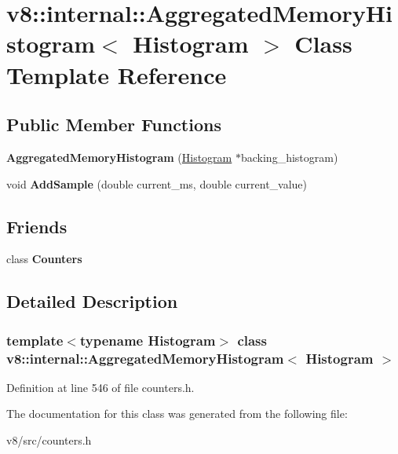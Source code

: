 \hypertarget{classv8_1_1internal_1_1AggregatedMemoryHistogram}{}\section{v8\+:\+:internal\+:\+:Aggregated\+Memory\+Histogram$<$ Histogram $>$ Class Template Reference}
\label{classv8_1_1internal_1_1AggregatedMemoryHistogram}
\subsection*{Public Member Functions}
\begin{DoxyCompactItemize}
\item 
\mbox{\label{classv8_1_1internal_1_1AggregatedMemoryHistogram_a8b49cfff760e104f1150397b4a774806}} 
{\bfseries Aggregated\+Memory\+Histogram} (\mbox{\hyperlink{classv8_1_1internal_1_1Histogram}{Histogram}} $\ast$backing\+\_\+histogram)
\item 
\mbox{\label{classv8_1_1internal_1_1AggregatedMemoryHistogram_afed07b5cc00d1e8f58be83d85ea6fe94}} 
void {\bfseries Add\+Sample} (double current\+\_\+ms, double current\+\_\+value)
\end{DoxyCompactItemize}
\subsection*{Friends}
\begin{DoxyCompactItemize}
\item 
\mbox{\label{classv8_1_1internal_1_1AggregatedMemoryHistogram_a5545327f141103b96b160ddc48274bc0}} 
class {\bfseries Counters}
\end{DoxyCompactItemize}


\subsection{Detailed Description}
\subsubsection*{template$<$typename Histogram$>$\newline
class v8\+::internal\+::\+Aggregated\+Memory\+Histogram$<$ Histogram $>$}



Definition at line 546 of file counters.\+h.



The documentation for this class was generated from the following file\+:\begin{DoxyCompactItemize}
\item 
v8/src/counters.\+h\end{DoxyCompactItemize}
